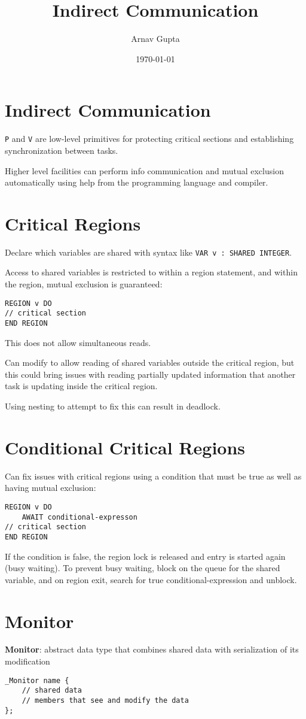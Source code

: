 \documentclass[11pt]{article}
\author{Arnav Gupta}
\date{\today}
\title{Indirect Communication}
\begin{document}
\maketitle
\tableofcontents

\section{Indirect Communication}
\label{sec:org03fe623}
\texttt{P} and \texttt{V} are low-level primitives for protecting critical sections and establishing
synchronization between tasks.

Higher level facilities can perform info communication and mutual exclusion automatically
using help from the programming language and compiler.
\section{Critical Regions}
\label{sec:org99911fc}
Declare which variables are shared with syntax like \texttt{VAR v : SHARED INTEGER}.

Access to shared variables is restricted to within a region statement, and within
the region, mutual exclusion is guaranteed:
\begin{verbatim}
REGION v DO
// critical section
END REGION
\end{verbatim}
This does not allow simultaneous reads.

Can modify to allow reading of shared variables outside the critical region, but this
could bring issues with reading partially updated information that another task is
updating inside the critical region.

Using nesting to attempt to fix this can result in deadlock.
\section{Conditional Critical Regions}
\label{sec:orgd5ebf47}
Can fix issues with critical regions using a condition that must be true as well as having
mutual exclusion:
\begin{verbatim}
REGION v DO
    AWAIT conditional-expresson
// critical section
END REGION
\end{verbatim}

If the condition is false, the region lock is released and entry is started again (busy waiting).
To prevent busy waiting, block on the queue for the shared variable, and on region exit, search
for true conditional-expression and unblock.
\section{Monitor}
\label{sec:orgbf01056}
\textbf{Monitor}: abstract data type that combines shared data with serialization of its modification
\begin{verbatim}
_Monitor name {
    // shared data
    // members that see and modify the data
};
\end{verbatim}
\end{document}
